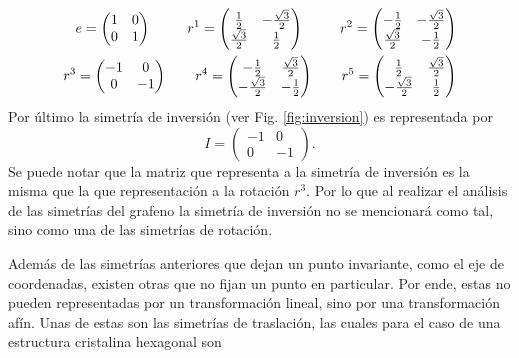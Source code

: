\begin{align}
  \begin{split}
    e = \begin{pmatrix}
       1 & 0\\
       0 & 1 
      \end{pmatrix} \hspace{0.9cm} r^1 = \begin{pmatrix}
    \frac{1}{2} & -\frac{\sqrt{3}}{2}\\
    \frac{\sqrt{3}}{2} & \frac{1}{2}
  \end{pmatrix} \hspace{0.9cm} r^2 = \begin{pmatrix}
  -\frac{1}{2} & -\frac{\sqrt{3}}{2} \\
  \frac{\sqrt{3}}{2} & -\frac{1}{2}
  \end{pmatrix}\\
    r^3 = \begin{pmatrix}
      -1 & 0\\
 0 & -1
    \end{pmatrix} \hspace{0.7cm} r^4 = \begin{pmatrix}
    -\frac{1}{2} & \frac{\sqrt{3}}{2} \\
    -\frac{\sqrt{3}}{2} & -\frac{1}{2}
    \end{pmatrix} \hspace{0.7cm} r^5 = \begin{pmatrix}
  \frac{1}{2} & \frac{\sqrt{3}}{2}\\
  -\frac{\sqrt{3}}{2} & \frac{1}{2}
  \end{pmatrix} 
   \end{split}
\end{align}
Por último la simetría de inversión (ver Fig. \ref{fig:inversion}) es representada por
\begin{equation}
   I = \begin{pmatrix}
     -1 & 0\\
     0 & -1
   \end{pmatrix}.
\end{equation}
Se puede notar que la matriz que representa a la simetría de inversión es la misma que la que representación a la rotación $r^3$. Por lo que al realizar el análisis de las simetrías del grafeno la simetría de inversión no se mencionará como tal, sino como una de las simetrías de rotación.\par
Además de las simetrías anteriores que dejan un punto invariante, como el eje de coordenadas, existen otras que no fijan un punto en particular. Por ende, estas no pueden representadas por un transformación lineal, sino por una transformación afín. Unas de estas son las simetrías de traslación, las cuales para el caso de una estructura cristalina hexagonal son
